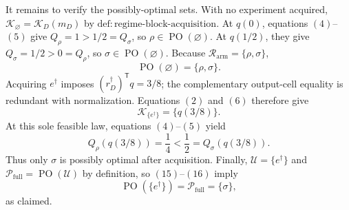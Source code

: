 It remains to verify the possibly-optimal sets.  With no experiment acquired,
\(\mathcal K_{\varnothing}=\mathcal K_D(m_D)\) by
\(\mathrm{def:regime\text{-}block\text{-}acquisition}\).  At \(q(0)\),
equations \((4)\)--\((5)\) give
\(Q_\rho=1>1/2=Q_\sigma\), so \(\rho\in\operatorname{PO}(\varnothing)\).
At \(q(1/2)\), they give
\(Q_\sigma=1/2>0=Q_\rho\), so
\(\sigma\in\operatorname{PO}(\varnothing)\).  Because
\(\mathcal R_{\mathrm{arm}}=\{\rho,\sigma\}\),
\[
\operatorname{PO}(\varnothing)=\{\rho,\sigma\}.
\tag{14}
\]
Acquiring \(e^\dagger\) imposes
\((r_D^\dagger)^{\mathsf T}q=3/8\); the complementary output-cell equality
is redundant with normalization.  Equations \((2)\) and \((6)\) therefore
give
\[
\mathcal K_{\{e^\dagger\}}=\{q(3/8)\}.
\tag{15}
\]
At this sole feasible law, equations \((4)\)--\((5)\) yield
\[
Q_\rho(q(3/8))=\frac14
<\frac12=Q_\sigma(q(3/8)).
\tag{16}
\]
Thus only \(\sigma\) is possibly optimal after acquisition.  Finally,
\(\mathcal U=\{e^\dagger\}\) and
\(\mathcal P_{\mathrm{full}}=\operatorname{PO}(\mathcal U)\) by definition,
so \((15)\)--\((16)\) imply
\[
\operatorname{PO}(\{e^\dagger\})
=\mathcal P_{\mathrm{full}}
=\{\sigma\},
\]
as claimed.
